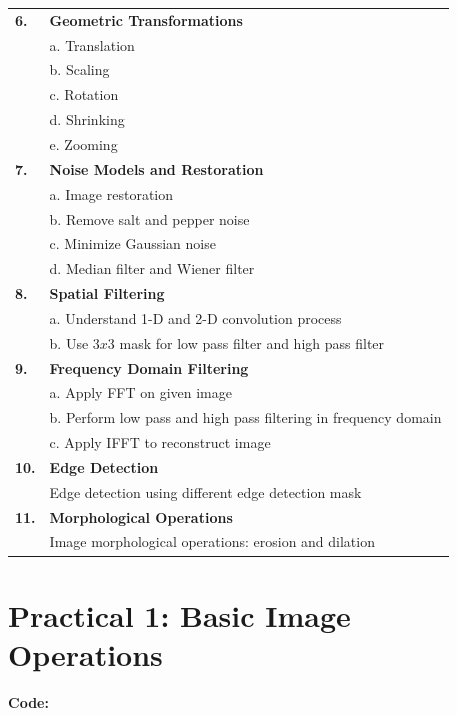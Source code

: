 \documentclass[12pt]{article}
\begin{document}
\begin{tabularx}{\textwidth}{|>{\centering\bfseries\large}p{1.5cm}|>{\large}X|}
6. & \textbf{Geometric Transformations} \\
   & a. Translation \\
   & b. Scaling \\
   & c. Rotation \\
   & d. Shrinking \\
   & e. Zooming \\
\hline
7. & \textbf{Noise Models and Restoration} \\
   & a. Image restoration \\
   & b. Remove salt and pepper noise \\
   & c. Minimize Gaussian noise \\
   & d. Median filter and Wiener filter \\
\hline
8. & \textbf{Spatial Filtering} \\
   & a. Understand 1-D and 2-D convolution process \\
   & b. Use 3$x$3 mask for low pass filter and high pass filter \\
\hline
9. & \textbf{Frequency Domain Filtering} \\
   & a. Apply FFT on given image \\
   & b. Perform low pass and high pass filtering in frequency domain \\
   & c. Apply IFFT to reconstruct image \\
\hline
10. & \textbf{Edge Detection} \\
   & Edge detection using different edge detection mask \\
\hline
11. & \textbf{Morphological Operations} \\
   & Image morphological operations: erosion and dilation \\
\hline
\end{tabularx}

\newpage
{}
\section*{\large\bfseries Practical 1: Basic Image Operations}

\textbf{\large Code:}
\end{document}
